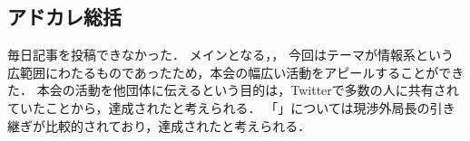\subsection*{アドカレ総括}


毎日記事を投稿できなかった．
メインとなる\firstGrade，，
今回はテーマが情報系という広範囲にわたるものであったため，本会の幅広い活動をアピールすることができた．
本会の活動を他団体に伝えるという目的は，Twitterで多数の人に共有されていたことから，達成されたと考えられる．
「」については現渉外局長の引き継ぎが比較的されており，達成されたと考えられる．
